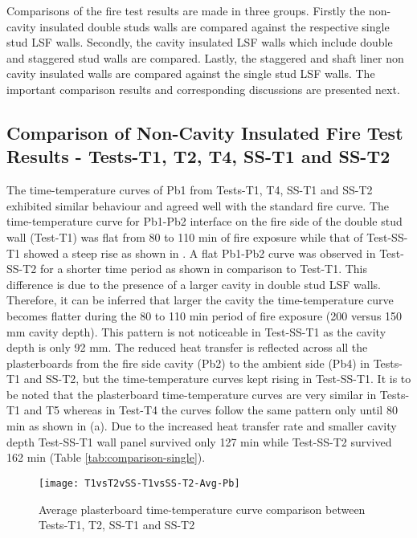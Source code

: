 Comparisons of the fire test results are made in three groups. Firstly the non-cavity insulated double studs walls are compared against the respective single stud LSF walls. Secondly, the cavity insulated LSF walls which include double and staggered stud walls are compared. Lastly, the staggered and shaft liner non cavity insulated walls are compared against the single stud LSF walls. The important comparison results and corresponding discussions are presented next.

\subsection{Comparison of Non-Cavity Insulated Fire Test Results - Tests-T1, T2, T4, SS-T1 and SS-T2}

The time-temperature curves of Pb1 from Tests-T1, T4, SS-T1 and SS-T2 exhibited similar behaviour and agreed well with the standard fire curve. The time-temperature curve for Pb1-Pb2 interface on the fire side of the double stud wall (Test-T1) was flat from 80 to 110 min of fire exposure while that of Test-SS-T1 showed a steep rise as shown in . A flat Pb1-Pb2 curve was observed in Test-SS-T2 for a shorter time period as shown in comparison to Test-T1. This difference is due to the presence of a larger cavity in double stud LSF walls. Therefore, it can be inferred that larger the cavity the time-temperature curve becomes flatter during the 80 to 110 min period of fire exposure (200 versus 150 mm cavity depth). This pattern is not noticeable in Test-SS-T1 as the cavity depth is only 92 mm. The reduced heat transfer is reflected across all the plasterboards from the fire side cavity (Pb2) to the ambient side (Pb4) in Tests-T1 and SS-T2, but the time-temperature curves kept rising in Test-SS-T1. It is to be noted that the plasterboard time-temperature curves are very similar in Tests-T1 and T5 whereas in Test-T4 the curves follow the same pattern only until 80 min as shown in  (a). Due to the increased heat transfer rate and smaller cavity depth Test-SS-T1 wall panel survived only 127 min while Test-SS-T2 survived 162 min (Table \ref{tab:comparison-single}).
\begin{figure}[!htbp]
	\centering
		\texttt{[image: T1vsT2vSS-T1vsSS-T2-Avg-Pb]}  
	\caption{Average plasterboard time-temperature curve comparison between Tests-T1, T2, SS-T1 and SS-T2}
	\label{fig:T1vsT2vSS-T1vsSS-T2-Avg-Pb}
\end{figure}

